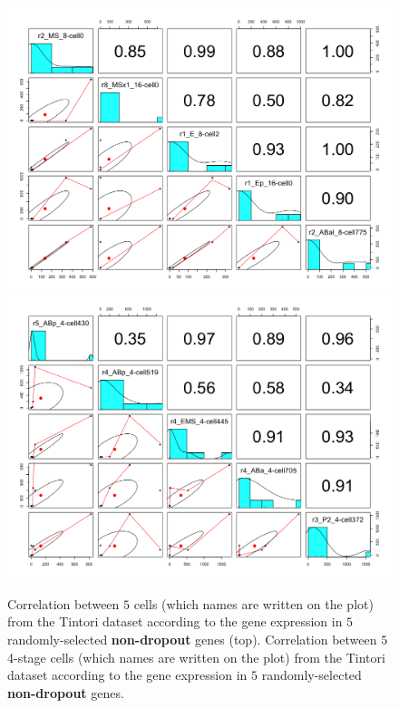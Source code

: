 \documentclass{report}
\begin{document}
{\begin{figure}[H]
\centering
\subfigure\includegraphics[scale=0.35]{plotsCopula/tintori/depCellnGene_nodropout_tintori.png}
\subfigure\includegraphics[scale=0.35]{plotsCopula/tintori/depCellnGene_nodropout_stage=4_tintori.png}
\caption{Correlation between $5$ cells (which names are written on the plot) from the Tintori dataset according to the gene expression in $5$ randomly-selected \textbf{non-dropout} genes (top). Correlation between $5$ 4-stage cells (which names are written on the plot) from the Tintori dataset according to the gene expression in $5$ randomly-selected \textbf{non-dropout} genes.}
\label{cellcorrelationnodropout}
\end{figure}

}
\end{document}
